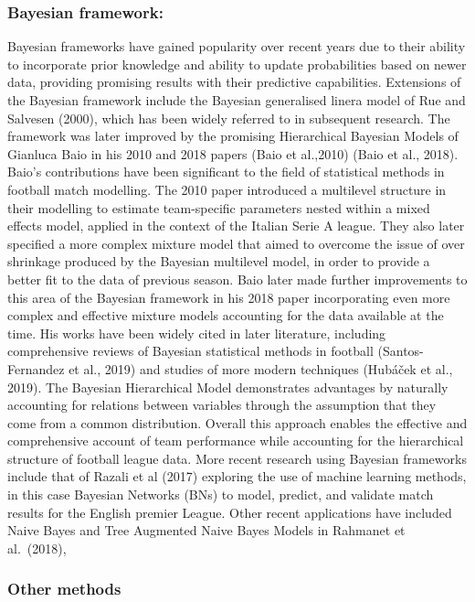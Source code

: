 \documentclass[
]{article}
\begin{document}
\hypertarget{bayesian-framework}{%
\subsubsection{Bayesian framework:}\label{bayesian-framework}}

Bayesian frameworks have gained popularity over recent years due to
their ability to incorporate prior knowledge and ability to update
probabilities based on newer data, providing promising results with
their predictive capabilities. Extensions of the Bayesian framework
include the Bayesian generalised linera model of Rue and Salvesen
(2000), which has been widely referred to in subsequent research. The
framework was later improved by the promising Hierarchical Bayesian
Models of Gianluca Baio in his 2010 and 2018 papers (Baio et al.,2010)
(Baio et al., 2018). Baio's contributions have been significant to the
field of statistical methods in football match modelling. The 2010 paper
introduced a multilevel structure in their modelling to estimate
team-specific parameters nested within a mixed effects model, applied in
the context of the Italian Serie A league. They also later specified a
more complex mixture model that aimed to overcome the issue of over
shrinkage produced by the Bayesian multilevel model, in order to provide
a better fit to the data of previous season. Baio later made further
improvements to this area of the Bayesian framework in his 2018 paper
incorporating even more complex and effective mixture models accounting
for the data available at the time. His works have been widely cited in
later literature, including comprehensive reviews of Bayesian
statistical methods in football (Santos-Fernandez et al., 2019) and
studies of more modern techniques (Hubáček et al., 2019). The Bayesian
Hierarchical Model demonstrates advantages by naturally accounting for
relations between variables through the assumption that they come from a
common distribution. Overall this approach enables the effective and
comprehensive account of team performance while accounting for the
hierarchical structure of football league data. More recent research
using Bayesian frameworks include that of Razali et al (2017) exploring
the use of machine learning methods, in this case Bayesian Networks
(BNs) to model, predict, and validate match results for the English
premier League. Other recent applications have included Naive Bayes and
Tree Augmented Naive Bayes Models in Rahmanet et al.~(2018),

\hypertarget{other-methods}{%
\subsubsection{Other methods}\label{other-methods}}
\end{document}
